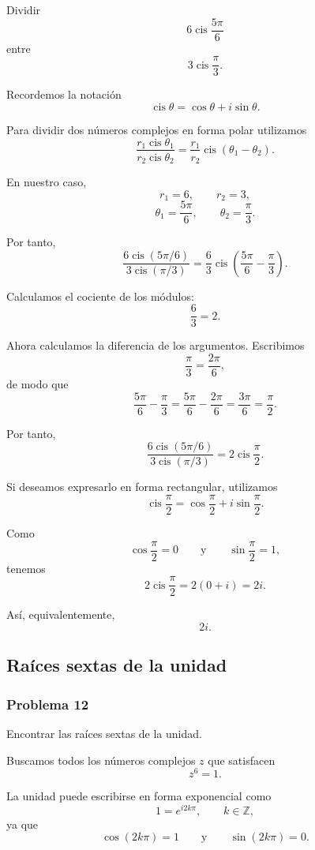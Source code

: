 Dividir
\[
6\operatorname{cis}\frac{5\pi}{6}
\]
entre
\[
3\operatorname{cis}\frac{\pi}{3}.
\]

Recordemos la notación
\[
\operatorname{cis}\theta
=
\cos\theta+i\sin\theta.
\]

Para dividir dos números complejos en forma polar utilizamos
\[
\frac{r_1\operatorname{cis}\theta_1}
     {r_2\operatorname{cis}\theta_2}
=
\frac{r_1}{r_2}
\operatorname{cis}(\theta_1-\theta_2).
\]

En nuestro caso,
\[
r_1=6,
\qquad
r_2=3,
\]
\[
\theta_1=\frac{5\pi}{6},
\qquad
\theta_2=\frac{\pi}{3}.
\]

Por tanto,
\[
\frac{6\operatorname{cis}(5\pi/6)}
     {3\operatorname{cis}(\pi/3)}
=
\frac63
\operatorname{cis}\left(
\frac{5\pi}{6}-\frac{\pi}{3}
\right).
\]

Calculamos el cociente de los módulos:
\[
\frac63=2.
\]

Ahora calculamos la diferencia de los argumentos. Escribimos
\[
\frac{\pi}{3}=\frac{2\pi}{6},
\]
de modo que
\[
\frac{5\pi}{6}-\frac{\pi}{3}
=
\frac{5\pi}{6}-\frac{2\pi}{6}
=
\frac{3\pi}{6}
=
\frac{\pi}{2}.
\]

Por tanto,
\[
\boxed{
\frac{6\operatorname{cis}(5\pi/6)}
     {3\operatorname{cis}(\pi/3)}
=
2\operatorname{cis}\frac{\pi}{2}
}.
\]

Si deseamos expresarlo en forma rectangular, utilizamos
\[
\operatorname{cis}\frac{\pi}{2}
=
\cos\frac{\pi}{2}
+i\sin\frac{\pi}{2}.
\]

Como
\[
\cos\frac{\pi}{2}=0
\qquad\text{y}\qquad
\sin\frac{\pi}{2}=1,
\]
tenemos
\[
2\operatorname{cis}\frac{\pi}{2}
=
2(0+i)
=
2i.
\]

Así, equivalentemente,
\[
\boxed{2i}.
\]

\subsection{Raíces sextas de la unidad}

\subsubsection*{Problema 12}

Encontrar las raíces sextas de la unidad.

Buscamos todos los números complejos $z$ que satisfacen
\[
z^6=1.
\]

La unidad puede escribirse en forma exponencial como
\[
1=e^{i2k\pi},
\qquad
k\in\mathbb Z,
\]
ya que
\[
\cos(2k\pi)=1
\qquad\text{y}\qquad
\sin(2k\pi)=0.
\]

